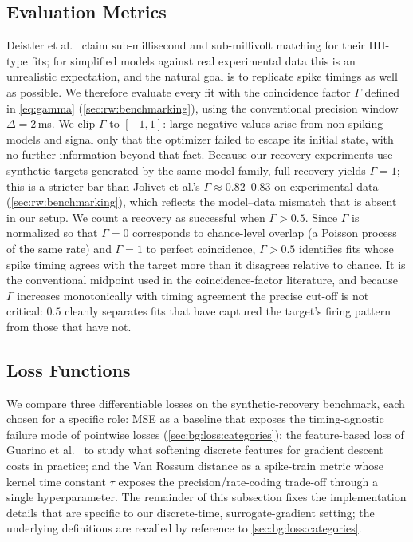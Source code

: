 \subsection{Evaluation Metrics}\label{sec:method:opt:evaluation-metrics}
Deistler et al.~\cite{Deistler2025} claim sub-millisecond and sub-millivolt matching for their \gls{HH}-type fits;
for simplified models against real experimental data this is an unrealistic expectation, and the natural goal is to replicate spike timings as well as possible.
We therefore evaluate every fit with the coincidence factor $\Gamma$ defined in \cref{eq:gamma} (\cref{sec:rw:benchmarking}), using the conventional precision window $\Delta = 2$\,ms.
We clip $\Gamma$ to $[-1, 1]$: large negative values arise from non-spiking models and signal only that the optimizer failed to escape its initial state, with no further information beyond that fact.
Because our recovery experiments use synthetic targets generated by the same model family, full recovery yields $\Gamma = 1$;
this is a stricter bar than Jolivet et al.'s $\Gamma \approx 0.82$--$0.83$ on experimental data (\cref{sec:rw:benchmarking}), which reflects the model--data mismatch that is absent in our setup.
We count a recovery as successful when $\Gamma > 0.5$.
Since $\Gamma$ is normalized so that $\Gamma = 0$ corresponds to chance-level overlap (a Poisson process of the same rate) and $\Gamma = 1$ to perfect coincidence, $\Gamma > 0.5$ identifies fits whose spike timing agrees with the target more than it disagrees relative to chance.
It is the conventional midpoint used in the coincidence-factor literature, and because $\Gamma$ increases monotonically with timing agreement the precise cut-off is not critical: $0.5$ cleanly separates fits that have captured the target's firing pattern from those that have not.

\subsection{Loss Functions}\label{sec:method:opt:loss}
We compare three differentiable losses on the synthetic-recovery benchmark, each chosen for a specific role:
\gls{MSE} as a baseline that exposes the timing-agnostic failure mode of pointwise losses (\cref{sec:bg:loss:categories});
the feature-based loss of Guarino et al.~\cite{Guarino2025} to study what softening discrete features for gradient descent costs in practice;
and the Van Rossum distance as a spike-train metric whose kernel time constant $\tau$ exposes the precision/rate-coding trade-off through a single hyperparameter.
The remainder of this subsection fixes the implementation details that are specific to our discrete-time, surrogate-gradient setting; the underlying definitions are recalled by reference to \cref{sec:bg:loss:categories}.

